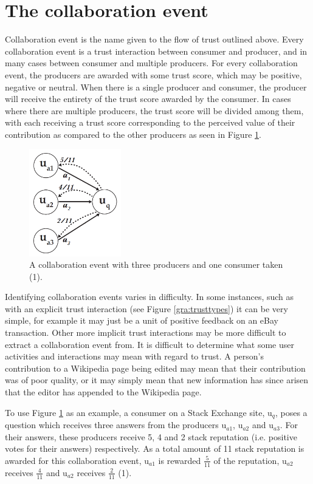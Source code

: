 \documentclass[]{final_report}
\begin{document}
\section{The collaboration event}

Collaboration event is the name given to the flow of trust outlined above. Every 
collaboration event is a trust interaction between consumer and producer, and in many cases between consumer and multiple producers. For every collaboration event, the producers are awarded with some trust score, which may be positive, negative or neutral. When there is a single producer and consumer, the producer will receive the entirety of the trust score awarded by the consumer. In cases where there are multiple producers, the trust score will be divided among them, with each receiving a trust score corresponding to the perceived value of their contribution as compared to the other producers as seen in Figure \ref{gra:singlecollabevent}.

\begin{figure}[ht!]
\centering
\includegraphics[width=40mm]{chap3/singlecollabevent.PNG}
\caption{A collaboration event with three producers and one consumer taken (1).}
\label{gra:singlecollabevent}
\end{figure}

Identifying collaboration events varies in difficulty. In some instances, such as with an explicit trust interaction (see Figure \ref{gra:trusttypes}) it can be very simple, for example it may just be a unit of positive feedback on an eBay transaction. Other more implicit trust interactions may be more difficult to extract a collaboration event from. It is difficult to determine what some user activities and interactions may mean with regard to trust. A person's contribution to a Wikipedia page being edited may mean that their contribution was of poor quality, or it may simply mean that new information has since arisen that the editor has appended to the Wikipedia page.

To use Figure \ref{gra:singlecollabevent} as an example, a consumer on a Stack Exchange site, u$_{q}$, poses a question which receives three answers from the producers u$_{a1}$, u$_{a2}$ and u$_{a3}$. For their answers, these producers receive 5, 4 and 2 stack reputation (i.e. positive votes for their answers) respectively. As a total amount of 11 stack reputation is awarded for this collaboration event, u$_{a1}$ is rewarded $\frac{5}{11}$ of the reputation, u$_{a2}$ receives $\frac{4}{11}$ and u$_{a2}$ receives $\frac{2}{11}$ (1).
\end{document}
